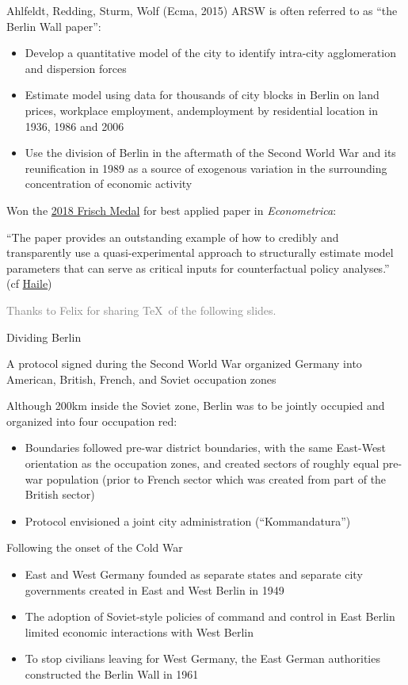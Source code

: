 \documentclass[10pt,notes=hide]{beamer}
\begin{document}
\begin{frame}{Ahlfeldt, Redding, Sturm, Wolf (Ecma, 2015)}
ARSW is often referred to as ``the Berlin Wall paper'':
\begin{itemize}
\item Develop a quantitative model of the city to identify intra-city agglomeration and dispersion forces
\item Estimate model using data for thousands of city blocks in Berlin on land prices, workplace employment, andemployment by residential location in 1936, 1986 and 2006
\item Use the division of Berlin in the aftermath of the Second World War and its reunification in 1989 as a source of exogenous variation in the surrounding concentration of economic activity
\end{itemize}
Won the \href{https://www.econometricsociety.org/society/awards}{2018 Frisch Medal} for best applied paper in \textit{Econometrica}:
{\small ``The paper provides an outstanding example of how to credibly and transparently use a quasi-experimental approach to structurally estimate model parameters that can serve as critical inputs for counterfactual policy analyses.''
(cf \href{http://www.econ.yale.edu/~pah29/intro.pdf}{Haile})\par}
{\small \textcolor{gray}{Thanks to Felix for sharing \TeX\ of the following slides.}}
\end{frame}
\begin{frame}{Dividing Berlin}
\begin{itemize}
{\small
\item A protocol signed during the Second World War organized Germany into American, British, French, and Soviet occupation zones
\item Although 200km inside the Soviet zone, Berlin was to be jointly occupied and organized into four occupation red:
\begin{itemize}
\item Boundaries followed pre-war district boundaries, with the same East-West orientation as the occupation zones, and created sectors of roughly equal pre-war population (prior to French sector which was created from part of the British sector)
  \item Protocol envisioned a joint city administration (``Kommandatura'')
    \end{itemize}
\item Following the onset of the Cold War
    \begin{itemize}
    \item East and West Germany founded as separate states and separate city governments created in East and West Berlin in 1949
    \item The adoption of Soviet-style policies of command and control in East Berlin limited economic interactions with West Berlin
    \item To stop civilians leaving for West Germany, the East German authorities constructed the Berlin Wall in 1961
    \end{itemize}
}
\end{itemize}
\end{frame}
\end{document}
